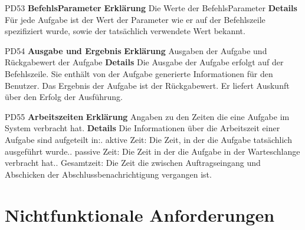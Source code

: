 \documentclass[a4paper,12pt]{article}
\begin{document}
\begin{itemize}[nosep]
\begin{minipage}[t]{\linewidth}
\item[PD53] \textbf{Befehls\gls{Parameter}}
\subitem \textbf{Erklärung} Die Werte der Befehls\gls{Parameter}
\subitem \textbf{Details} Für jede \gls{Aufgabe} ist der Wert der \gls{Parameter} wie er auf der \gls{Befehlszeile} spezifiziert wurde, sowie der tatsächlich verwendete Wert bekannt.
\end{minipage}
\vspace{20mm}

\begin{minipage}[t]{\linewidth}
\item[PD54] \textbf{Ausgabe und Ergebnis}
\subitem \textbf{Erklärung} Ausgaben der \gls{Aufgabe} und Rückgabewert der \gls{Aufgabe}
\subitem \textbf{Details} Die Ausgabe der \gls{Aufgabe} erfolgt auf der \gls{Befehlszeile}. Sie enthält von der \gls{Aufgabe} generierte Informationen für den \gls{Benutzer}.\newline
Das Ergebnis der \gls{Aufgabe} ist der Rückgabewert. Er liefert Auskunft über den Erfolg der Ausführung.
\end{minipage}
\vspace{20mm}

\begin{minipage}[t]{\linewidth}
\item[PD55] \textbf{Arbeitszeiten}
\subitem \textbf{Erklärung} Angaben zu den Zeiten die eine \gls{Aufgabe} im System verbracht hat.
\subitem \textbf{Details} Die Informationen über die Arbeitszeit einer \gls{Aufgabe} sind aufgeteilt in:. aktive Zeit: Die Zeit, in der die \gls{Aufgabe} tatsächlich ausgeführt wurde.. passive Zeit: Die Zeit in der die \gls{Aufgabe} in der \gls{Warteschlange} verbracht hat.. Gesamtzeit: Die Zeit die zwischen Auftragseingang und Abschicken der Abschlussbenachrichtigung vergangen ist.
\end{minipage}
\vspace{20mm}

\end{itemize}
\newpage

\section{Nichtfunktionale Anforderungen}
\end{document}
